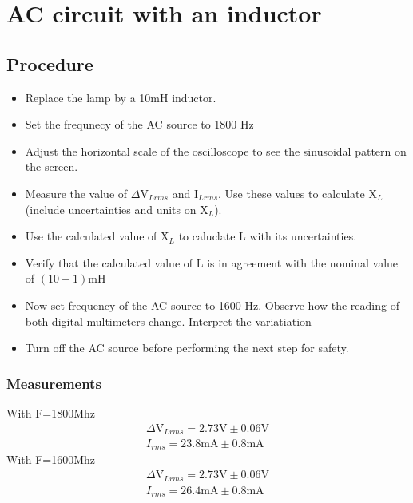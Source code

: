 \documentclass{report}
\begin{document}
\chapter{AC circuit with an inductor}

\section{Procedure}
\begin{itemize}
    \item Replace the lamp by a 10\si{\milli\henry} inductor.
    \item Set the frequnecy of the AC source to 1800 \si{\hertz}
    \item Adjust the horizontal scale of the oscilloscope to see the sinusoidal pattern on the screen.
    \item Measure the value of $\Delta\si{\volt}_{Lrms}$ and I$_{Lrms}$. Use these values to calculate X$_{L}$ (include uncertainties and units on X$_{L}$).
    \item Use the calculated value of X$_{L}$ to caluclate L with its uncertainties.
    \item Verify that the calculated value of L is in agreement with the nominal value of $(10\pm1)\si{\milli\henry}$
    \item Now set frequency of the AC source to 1600 \si{\hertz}. Observe how the reading of both digital multimeters change. Interpret the variatiation 
    \item Turn off the AC source before performing the next step for safety.
\end{itemize}
    

\subsection{Measurements}
With F=1800Mhz
\begin{gather}
    \Delta\si{\volt}_{Lrms}=2.73\si{\volt}\pm0.06\si{\volt}\\ 
    I_{rms}=23.8\si{\milli\ampere}\pm0.8\si{\milli\ampere}
\end{gather}
With F=1600Mhz
\begin{gather}
    \Delta\si{\volt}_{Lrms}=2.73\si{\volt}\pm0.06\si{\volt}\\ 
    I_{rms}=26.4\si{\milli\ampere}\pm0.8\si{\milli\ampere}
\end{gather}
\end{document}
